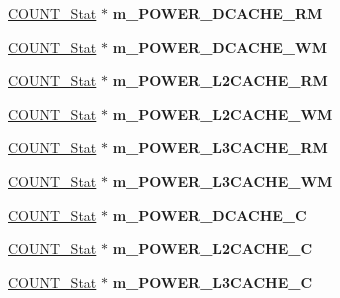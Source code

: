 \begin{DoxyCompactItemize}
\item 
\hypertarget{classall__stats__c_a066269f446e710524e4140fd2224bae4}{
\hyperlink{classCOUNT__Stat}{COUNT\_\-Stat} $\ast$ {\bfseries m\_\-POWER\_\-DCACHE\_\-RM}}
\label{classall__stats__c_a066269f446e710524e4140fd2224bae4}

\item 
\hypertarget{classall__stats__c_a2b05d4b0f514a9d8a6e76ee0c8fdf063}{
\hyperlink{classCOUNT__Stat}{COUNT\_\-Stat} $\ast$ {\bfseries m\_\-POWER\_\-DCACHE\_\-WM}}
\label{classall__stats__c_a2b05d4b0f514a9d8a6e76ee0c8fdf063}

\item 
\hypertarget{classall__stats__c_a070d43b70a8ebd0f71bc2c54eda69961}{
\hyperlink{classCOUNT__Stat}{COUNT\_\-Stat} $\ast$ {\bfseries m\_\-POWER\_\-L2CACHE\_\-RM}}
\label{classall__stats__c_a070d43b70a8ebd0f71bc2c54eda69961}

\item 
\hypertarget{classall__stats__c_a0827e8affeb8051d3d6fb85e1cb16ebb}{
\hyperlink{classCOUNT__Stat}{COUNT\_\-Stat} $\ast$ {\bfseries m\_\-POWER\_\-L2CACHE\_\-WM}}
\label{classall__stats__c_a0827e8affeb8051d3d6fb85e1cb16ebb}

\item 
\hypertarget{classall__stats__c_adac05f3199008a161118a508cf134713}{
\hyperlink{classCOUNT__Stat}{COUNT\_\-Stat} $\ast$ {\bfseries m\_\-POWER\_\-L3CACHE\_\-RM}}
\label{classall__stats__c_adac05f3199008a161118a508cf134713}

\item 
\hypertarget{classall__stats__c_ab5aa8a75cd611f3e87a536934c81618b}{
\hyperlink{classCOUNT__Stat}{COUNT\_\-Stat} $\ast$ {\bfseries m\_\-POWER\_\-L3CACHE\_\-WM}}
\label{classall__stats__c_ab5aa8a75cd611f3e87a536934c81618b}

\item 
\hypertarget{classall__stats__c_a147a5d7eb3ae2a164fe7d3307adf629c}{
\hyperlink{classCOUNT__Stat}{COUNT\_\-Stat} $\ast$ {\bfseries m\_\-POWER\_\-DCACHE\_\-C}}
\label{classall__stats__c_a147a5d7eb3ae2a164fe7d3307adf629c}

\item 
\hypertarget{classall__stats__c_aa063ff47b5548a30bd5a2c8536a31e66}{
\hyperlink{classCOUNT__Stat}{COUNT\_\-Stat} $\ast$ {\bfseries m\_\-POWER\_\-L2CACHE\_\-C}}
\label{classall__stats__c_aa063ff47b5548a30bd5a2c8536a31e66}

\item 
\hypertarget{classall__stats__c_ad511b1ab20cd1560e93b8ddd75fdcf1f}{
\hyperlink{classCOUNT__Stat}{COUNT\_\-Stat} $\ast$ {\bfseries m\_\-POWER\_\-L3CACHE\_\-C}}
\label{classall__stats__c_ad511b1ab20cd1560e93b8ddd75fdcf1f}


\end{DoxyCompactItemize}
